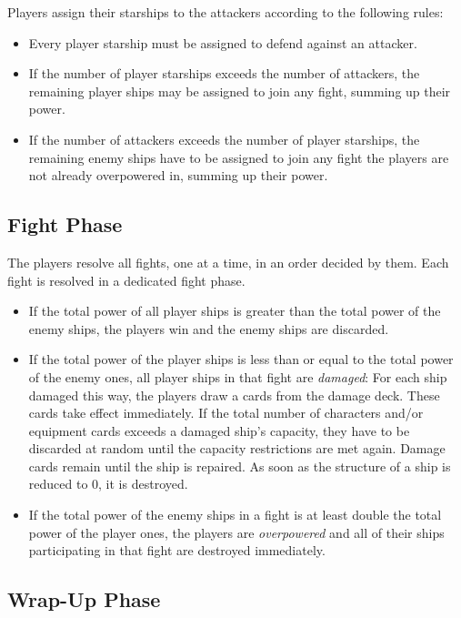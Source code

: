 \documentclass[11pt, a4paper]{article}
\begin{document}
Players assign their starships to the attackers according to the following
rules:

\begin{itemize}
 \item Every player starship must be assigned to defend against an attacker.
 \item If the number of player starships exceeds the number of attackers, the
remaining player ships may be assigned to join any fight, summing up their
power.
 \item If the number of attackers exceeds the number of player starships, the
remaining enemy ships have to be assigned to join any fight the players are not
already overpowered in, summing up their power.
\end{itemize}

\subsection{Fight Phase}

The players resolve all fights, one at a time, in an order decided by them.
Each fight is resolved in a dedicated fight phase.

\begin{itemize}
 \item If the total power of all player ships is greater than the total power of
the enemy ships, the players win and the enemy ships are discarded.
 \item If the total power of the player ships is less than or equal to the total
power of the enemy ones, all player ships in that fight are \emph{damaged}: For
each ship damaged this way, the players draw a cards from the damage deck.
These cards take effect immediately. If the total number of characters and/or
equipment cards exceeds a damaged ship's capacity, they have to be discarded at
random until the capacity restrictions are met again. Damage cards remain until
the ship is repaired. As soon as the structure of a ship is reduced to 0, it is
destroyed.
 \item If the total power of the enemy ships in a fight is at least double the
total power of the player ones, the players are \emph{overpowered} and all of
their ships participating in that fight are destroyed immediately.
\end{itemize}

\subsection{Wrap-Up Phase}
\end{document}
